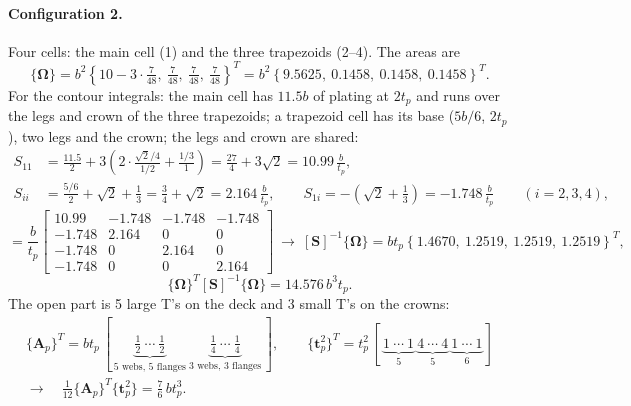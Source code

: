 \paragraph{Configuration 2.}
Four cells: the main cell (1) and the three trapezoids (2--4). The areas are
\begin{equation*}
  \{\boldsymbol{\Omega}\} = b^2\left\{10-3\cdot\tfrac{7}{48},\ \tfrac{7}{48},\ \tfrac{7}{48},\ \tfrac{7}{48}\right\}^T
  = b^2\left\{9.5625,\ 0.1458,\ 0.1458,\ 0.1458\right\}^T .
\end{equation*}
For the contour integrals: the main cell has $11.5b$ of plating at $2t_p$ and runs over the legs and crown of the three trapezoids; a trapezoid cell has its base ($5b/6$, $2t_p$), two legs and the crown; the legs and crown are shared:
\begin{align*}
  S_{11} &= \frac{11.5}{2} + 3\left(2\cdot\frac{\sqrt2/4}{1/2} + \frac{1/3}{1}\right) = \frac{27}{4} + 3\sqrt2 = 10.99\,\frac{b}{t_p},\\
  S_{ii} &= \frac{5/6}{2} + \sqrt2 + \frac13 = \frac34 + \sqrt2 = 2.164\,\frac{b}{t_p}, \qquad
  S_{1i} = -\left(\sqrt2 + \frac13\right) = -1.748\,\frac{b}{t_p} \qquad (i=2,3,4),
\end{align*}
\begin{equation*}
  [\mathbf{S}] = \frac{b}{t_p}
  \begin{bmatrix}
    10.99 & -1.748 & -1.748 & -1.748 \\
    -1.748 & 2.164 & 0 & 0 \\
    -1.748 & 0 & 2.164 & 0 \\
    -1.748 & 0 & 0 & 2.164
  \end{bmatrix}
  \ \rightarrow\
  [\mathbf{S}]^{-1}\{\boldsymbol{\Omega}\} = bt_p\left\{1.4670,\ 1.2519,\ 1.2519,\ 1.2519\right\}^T,
\end{equation*}
\begin{equation*}
  \{\boldsymbol{\Omega}\}^T[\mathbf{S}]^{-1}\{\boldsymbol{\Omega}\} = 14.576\,b^3t_p .
\end{equation*}
The open part is 5 large T's on the deck and 3 small T's on the crowns:
\begin{gather*}
  \{\mathbf{A}_p\}^T = bt_p\,[\,\underbrace{\tfrac12\ \cdots\ \tfrac12}_{\text{5 webs, 5 flanges}}\ \underbrace{\tfrac14\ \cdots\ \tfrac14}_{\text{3 webs, 3 flanges}}\,],
  \qquad
  \{\mathbf{t}_p^2\}^T = t_p^2\,[\,\underbrace{1\ \cdots\ 1}_{\text{5}}\ \underbrace{4\ \cdots\ 4}_{\text{5}}\ \underbrace{1\ \cdots\ 1}_{\text{6}}\,]\\
  \rightarrow\quad
  \tfrac{1}{12}\{\mathbf{A}_p\}^T\{\mathbf{t}_p^2\} = \tfrac{7}{6}\,bt_p^3 .
\end{gather*}
